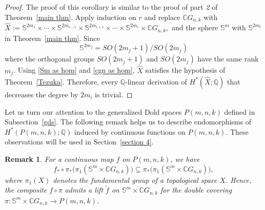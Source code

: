 \documentclass{amsart}
\newtheorem{remark}[theorem]{Remark}
\newcommand{\thmref}[1]{Theorem~\ref{#1}}
\newcommand{\secref}[1]{Section~\ref{#1}}
\newcommand{\subsecref}[1]{Subsection~\ref{#1}}
\begin{document}
	\begin{proof}
		The proof of this corollary is similar to the proof of %
part \textit{2} of \thmref{main thm}. Apply induction on $r$ and replace $\mathbb{C}G_{n,k}$ with $\hat{X} := \mathbb{S}^{2m_1}\times\cdots\times \mathbb{S}^{2m_{i-1}}\times \mathbb{S}^{2m_{i+1}}\times\cdots\times \mathbb{S}^{2m_r}\times \mathbb{C}G_{n,k},$ and the sphere $\mathbb{S}^m$ with $\mathbb{S}^{2m_i}$ in \thmref{main thm}. Since \begin{equation}\label{Sm as hom}
			\mathbb S^{2m_j}=SO(2m_j+1)/SO(2m_j)
		\end{equation}
		where %
the orthogonal groups $SO(2m_j+1)$ and $SO(2m_j)$ have the same rank $m_j$. Using \eqref{Sm as hom} and \eqref{cgn as hom}, $\hat{X}$ satisfies the hypothesis of \thmref{Tezuka}. Therefore, every $\mathbb{Q}$-linear derivation of $H^*(\hat{X};\mathbb{Q})$ that decreases the degree by $2m_i$ is trivial.
	\end{proof}
	Let us turn our attention to the generalized Dold spaces $P(m,n,k)$ defined %
in \subsecref{gds}. The %
following remark helps us to describe endomorphisms of $H^*(P(m,n,k);\mathbb{Q})$ induced by continuous functions on $P(m,n,k)$. These observations will be used in \secref{section 4}.
	\begin{remark}\label{lift}
		For a continuous map $f$ on $P(m,n,k)$, we have  
		\begin{equation} \label{lift of f}
			f_*\circ \pi_*\big(\pi_1(\mathbb{S}^m\times \mathbb{C}G_{n,k})\big)
			\subseteq \pi_*\big(\pi_1(\mathbb{S}^m\times \mathbb{C}G_{n,k})\big),
		\end{equation}
		where $\pi_1(X)$ denotes the fundamental group of a topological space $X$. Hence, the composite $f\circ \pi$ admits a lift $\tilde f$ on
		$\mathbb{S}^m\times \mathbb{C}G_{n,k}$ for the double covering  
		$\pi:\mathbb{S}^m\times \mathbb{C}G_{n,k}\to P(m,n,k)$.
	\end{remark}
\end{document}
